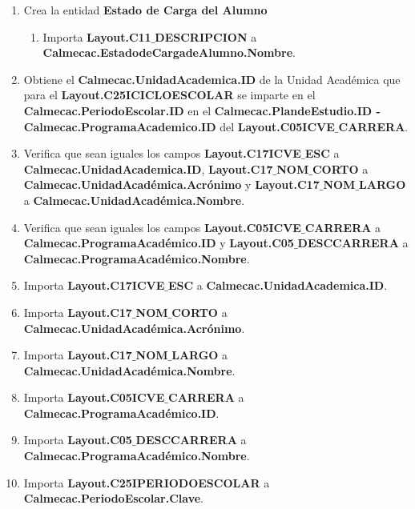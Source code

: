 \begin{enumerate}
\begin{enumerate}
\begin{enumerate}
			\end{enumerate}
		
		\item Crea la entidad \textbf{Estado de Carga del Alumno}
		
			\begin{enumerate}
			
			\item Importa \textbf{Layout.C11$\_$DESCRIPCION} a \textbf{Calmecac.EstadodeCargadeAlumno.Nombre}.%
			
			\end{enumerate}
		
		\item Obtiene el \textbf{Calmecac.UnidadAcademica.ID} de la Unidad Académica que para el \textbf{Layout.C25ICICLOESCOLAR} se imparte en el \textbf{Calmecac.PeriodoEscolar.ID} en el \textbf{Calmecac.PlandeEstudio.ID - Calmecac.ProgramaAcademico.ID} del \textbf{Layout.C05ICVE$\_$CARRERA}. 
		
		\item Verifica que sean iguales los campos \textbf{Layout.C17ICVE$\_$ESC} a \textbf{Calmecac.UnidadAcademica.ID}, \textbf{Layout.C17$\_$NOM$\_$CORTO} a \textbf{Calmecac.UnidadAcadémica.Acrónimo} y  \textbf{Layout.C17$\_$NOM$\_$LARGO} a \textbf{Calmecac.UnidadAcadémica.Nombre}. 
		
		\item Verifica que sean iguales los campos \textbf{Layout.C05ICVE$\_$CARRERA} a \textbf{Calmecac.ProgramaAcadémico.ID} y \textbf{Layout.C05$\_$DESCCARRERA} a \textbf{Calmecac.ProgramaAcadémico.Nombre}. 
		
		\item Importa \textbf{Layout.C17ICVE$\_$ESC} a \textbf{Calmecac.UnidadAcademica.ID}. 
		
		\item Importa \textbf{Layout.C17$\_$NOM$\_$CORTO} a \textbf{Calmecac.UnidadAcadémica.Acrónimo}.
		
		\item Importa \textbf{Layout.C17$\_$NOM$\_$LARGO} a \textbf{Calmecac.UnidadAcadémica.Nombre}.
		
		\item Importa \textbf{Layout.C05ICVE$\_$CARRERA} a \textbf{Calmecac.ProgramaAcadémico.ID}.
		
		\item Importa \textbf{Layout.C05$\_$DESCCARRERA} a \textbf{Calmecac.ProgramaAcadémico.Nombre}.
		
		\item Importa \textbf{Layout.C25IPERIODOESCOLAR} a \textbf{Calmecac.PeriodoEscolar.Clave}. 

	\end{enumerate}

\end{enumerate}

